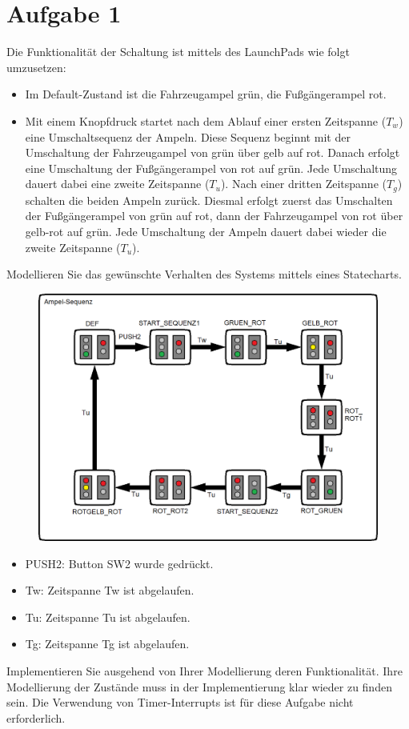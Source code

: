 \section{Aufgabe 1}
Die Funktionalität der Schaltung ist mittels des LaunchPads wie folgt umzusetzen:
\begin{itemize}
	\item Im Default-Zustand ist die Fahrzeugampel grün, die Fu\ss{}gängerampel rot. 
	\item Mit einem Knopfdruck startet nach dem Ablauf einer ersten Zeitspanne ($T_w$) eine Umschaltsequenz der Ampeln. Diese Sequenz beginnt mit der Umschaltung der Fahrzeugampel von grün über gelb auf rot. Danach erfolgt eine Umschaltung der Fu\ss{}gängerampel von rot auf grün. Jede Umschaltung dauert dabei eine zweite Zeitspanne ($T_u$). Nach einer dritten Zeitspanne ($T_g$) schalten die beiden Ampeln zurück. Diesmal erfolgt zuerst das Umschalten der Fu\ss{}gängerampel von grün auf rot, dann der Fahrzeugampel von rot über gelb-rot auf grün. Jede Umschaltung der Ampeln dauert dabei wieder die zweite Zeitspanne ($T_u$).
\end{itemize}
Modellieren Sie das gewünschte Verhalten des Systems mittels eines Statecharts.\\
\begin{figure}[h]
	\centering
	\includegraphics[width=0.7\linewidth]{images/Statechart}
\end{figure}
\begin{itemize}
	\item PUSH2: Button SW2 wurde gedrückt.
	\item Tw: Zeitspanne Tw ist abgelaufen.
	\item Tu: Zeitspanne Tu ist abgelaufen.
	\item Tg: Zeitspanne Tg ist abgelaufen.
\end{itemize}
Implementieren Sie ausgehend von Ihrer Modellierung deren Funktionalität. Ihre Modellierung der Zustände muss in der Implementierung klar wieder zu finden sein. Die Verwendung von Timer-Interrupts ist für diese Aufgabe nicht erforderlich.\\ \\
